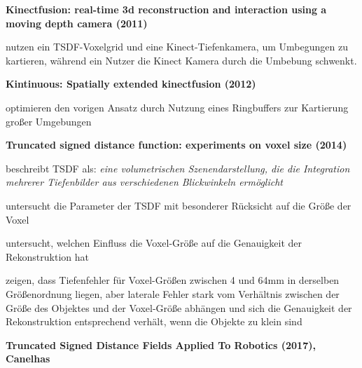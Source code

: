 

\textbf{Kinectfusion: real-time 3d reconstruction and interaction using a moving depth camera (2011)} \cite{izadi2011kinectfusion}

\begin{description}
\item
nutzen ein TSDF-Voxelgrid und eine Kinect-Tiefenkamera, um Umbegungen zu kartieren, während ein Nutzer die Kinect Kamera durch die Umbebung schwenkt.
\end{description}


\textbf{Kintinuous: Spatially extended kinectfusion (2012)}\cite{whelan2012kintinuous}

\begin{description}
\item
optimieren den vorigen Ansatz durch Nutzung eines Ringbuffers zur Kartierung großer Umgebungen
\end{description}


\textbf{Truncated signed distance function: experiments on voxel size (2014)}\cite{werner2014truncated}

\begin{description}
\item
beschreibt TSDF als: \emph{eine volumetrischen Szenendarstellung, die die Integration mehrerer Tiefenbilder aus verschiedenen Blickwinkeln ermöglicht}
\item
untersucht die Parameter der TSDF mit besonderer Rücksicht auf die Größe der Voxel
\item
untersucht, welchen Einfluss die Voxel-Größe auf die Genauigkeit der Rekonstruktion hat
\item
zeigen, dass Tiefenfehler für Voxel-Größen zwischen 4 und 64mm in derselben Größenordnung liegen, aber laterale Fehler stark vom Verhältnis zwischen der Größe des Objektes und der Voxel-Größe abhängen und sich die Genauigkeit der Rekonstruktion entsprechend verhält, wenn die Objekte zu klein sind
\end{description}


\textbf{Truncated Signed Distance Fields Applied To Robotics (2017), Canelhas} \cite{Canelhas2017TruncatedSD}

